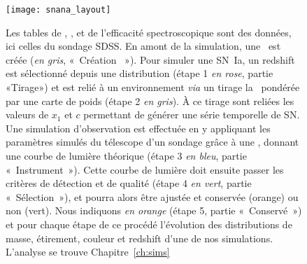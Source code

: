 \documentclass[../main/main.tex]{subfiles}
\begin{document}
\begin{figure}[p]
    \vspace*{-3.2cm}
    \centerfloat
    \texttt{[image: snana\_layout]}
    \caption[Schéma de fonctionnement d'une simulation avec
    \snana]{\footnotesize Les tables de \wgtmap, \simlib, et de l'efficacité
        spectroscopique sont des données, ici celles du sondage SDSS. En amont
        de la simulation, une \hostlib\ est créée (\textit{en gris}, «~Création
        \hostlib~»). Pour simuler une SN~Ia, un redshift est sélectionné depuis
        une distribution (étape 1 \textit{en rose}, partie «Tirage») et est
        relié à un environnement \textit{via} un tirage la \hostlib\ pondérée
        par une carte de poids (étape 2 \textit{en gris}). À ce tirage sont
        reliées les valeurs de $x_1$ et $c$ permettant de générer une série
        temporelle de SN. Une simulation d'observation est effectuée en y
        appliquant les paramètres simulés du télescope d'un sondage grâce à une
        \simlib, donnant une courbe de lumière théorique (étape 3 \textit{en
        bleu}, partie «~Instrument~»). Cette courbe de lumière doit ensuite
        passer les critères de détection et de qualité (étape 4 \textit{en
        vert}, partie «~Sélection~»), et pourra alors être ajustée et conservée
        (orange) ou non (vert). Nous indiquons \textit{en orange} (étape 5,
        partie «~Conservé~») et pour chaque étape de ce procédé l'évolution des
        distributions de masse, étirement, couleur et redshift d'une de nos
    simulations. L'analyse se trouve Chapitre~\ref{ch:sims}}
    \label{fig:snana_func}
\end{figure}
\end{document}
